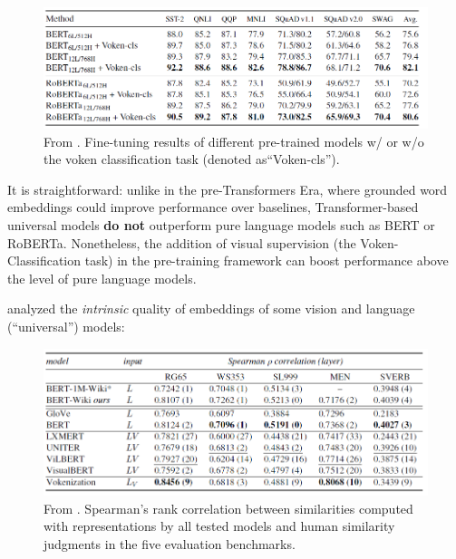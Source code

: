 \documentclass[
]{krantz}
\begin{document}
\begin{figure}

{\centering \includegraphics[width=1\linewidth]{figures/02-03-img-support-text/img-tan2020-03} 

}

\caption{From \citet{tan2020vokenization}. Fine-tuning results of different pre-trained models w/ or w/o the voken classification task (denoted as``Voken-cls'').}\label{fig:img-tan2020-03}
\end{figure}



It is straightforward: unlike in the pre-Transformers Era, where grounded word embeddings could improve performance over baselines, Transformer-based universal models \textbf{do not} outperform pure language models such as BERT or RoBERTa. Nonetheless, the addition of visual supervision (the Voken-Classification task) in the pre-training framework can boost performance above the level of pure language models.

\citet{pezzelle2021word} analyzed the \emph{intrinsic} quality of embeddings of some vision and language (``universal'') models:

\begin{figure}

{\centering \includegraphics[width=1\linewidth]{figures/02-03-img-support-text/img-pezzele2021-01} 

}

\caption{From \citet{pezzelle2021word}. Spearman's rank correlation between similarities computed with representations by all tested models and human similarity judgments in the five evaluation benchmarks.}\label{fig:img-pezzele2021-01}
\end{figure}
\end{document}
